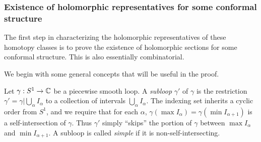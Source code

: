 \documentclass[12pt]{amsart}
\begin{document}



\subsubsection{Existence of holomorphic representatives for some
  conformal structure}
\label{sec:existence}

The first step in characterizing the holomorphic representatives of
these homotopy classes is to prove the existence of holomorphic
sections for some conformal structure. This is also essentially combinatorial.

We begin with some general concepts that will be useful in the proof.

\begin{definition}
  Let $\gamma: S^1 \to \mathbb{C}$ be a piecewise smooth loop. A
  \emph{subloop} $\gamma'$ of $\gamma$ is the restriction $\gamma' =
  \gamma|\bigcup_\alpha I_{\alpha}$ to a collection of intervals
  $\bigcup_\alpha I_{\alpha}$. The indexing set inherits a cyclic
  order from $S^1$, and we require that for each $\alpha$,
  $\gamma(\max I_{\alpha}) = \gamma(\min I_{\alpha+1})$ is a
  self-intersection of $\gamma$. Thus $\gamma'$ simply ``skips'' the
  portion of $\gamma$ between $\max I_\alpha$ and $\min
  I_{\alpha+1}$. A subloop is called \emph{simple} if it is non-self-intersecting.
\end{definition}
\end{document}
